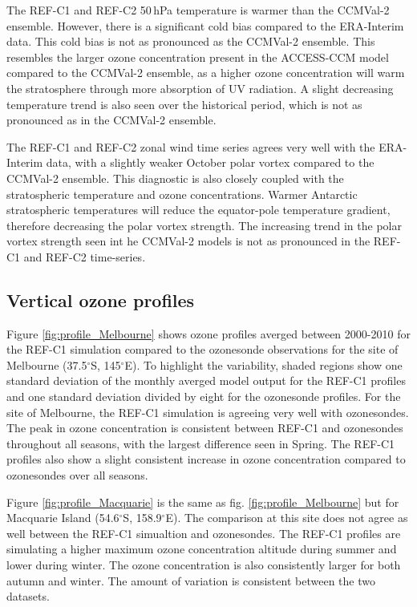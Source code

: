 The REF-C1 and REF-C2 50\,hPa temperature is warmer than the CCMVal-2 ensemble. However, there is a significant cold bias compared to the ERA-Interim data. This cold bias is not as pronounced as the CCMVal-2 ensemble. This resembles the larger ozone concentration present in the ACCESS-CCM model compared to the CCMVal-2 ensemble, as a higher ozone concentration will warm the stratosphere through more absorption of UV radiation. A slight decreasing temperature trend is also seen over the historical period, which is not as pronounced as in the CCMVal-2 ensemble.

The REF-C1 and REF-C2 zonal wind time series agrees very well with the ERA-Interim data, with a slightly weaker October polar vortex compared to the CCMVal-2 ensemble. This diagnostic is also closely coupled with the stratospheric temperature and ozone concentrations. Warmer Antarctic stratospheric temperatures will reduce the equator-pole temperature gradient, therefore decreasing the polar vortex strength. The increasing trend in the polar vortex strength seen int he CCMVal-2 models is not as pronounced in the REF-C1 and REF-C2 time-series.

\subsection{Vertical ozone profiles}
Figure \ref{fig:profile_Melbourne} shows ozone profiles averged between 2000-2010 for the REF-C1 simulation compared to the ozonesonde observations for the site of Melbourne (37.5$^\circ$S, 145$^\circ$E). To highlight the variability, shaded regions show one standard deviation of the monthly averged model output for the REF-C1 profiles and one standard deviation divided by eight for the ozonesonde profiles. For the site of Melbourne, the REF-C1 simulation is agreeing very well with ozonesondes. The peak in ozone concentration is consistent between REF-C1 and ozonesondes throughout all seasons, with the largest difference seen in Spring. The REF-C1 profiles also show a slight consistent increase in ozone concentration compared to ozonesondes over all seasons.

Figure \ref{fig:profile_Macquarie} is the same as fig. \ref{fig:profile_Melbourne} but for Macquarie Island (54.6$^\circ$S, 158.9$^\circ$E). The comparison at this site does not agree as well between the REF-C1 simualtion and ozonesondes. The REF-C1 profiles are simulating a higher maximum ozone concentration altitude during summer and lower during winter. The ozone concentration is also consistently larger for both autumn and winter. The amount of variation is consistent between the two datasets.

